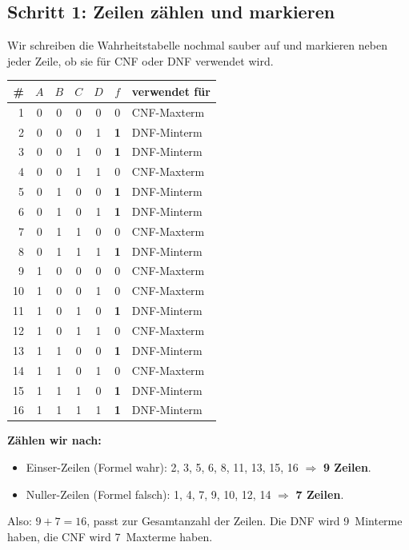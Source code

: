 \documentclass[a4paper,12pt]{article}
\begin{document}
\subsection*{Schritt 1: Zeilen z\"ahlen und markieren}

Wir schreiben die Wahrheitstabelle nochmal sauber auf und markieren
neben jeder Zeile, ob sie f\"ur CNF oder DNF verwendet wird.

\begin{center}
\renewcommand{\arraystretch}{1.1}
\begin{tabular}{r|cccc|c|l}
\toprule
\# & $A$ & $B$ & $C$ & $D$ & $f$ & verwendet f\"ur \\
\midrule
 1 & 0 & 0 & 0 & 0 & 0 & CNF-Maxterm \\
 2 & 0 & 0 & 0 & 1 & \textbf{1} & DNF-Minterm \\
 3 & 0 & 0 & 1 & 0 & \textbf{1} & DNF-Minterm \\
 4 & 0 & 0 & 1 & 1 & 0 & CNF-Maxterm \\
 5 & 0 & 1 & 0 & 0 & \textbf{1} & DNF-Minterm \\
 6 & 0 & 1 & 0 & 1 & \textbf{1} & DNF-Minterm \\
 7 & 0 & 1 & 1 & 0 & 0 & CNF-Maxterm \\
 8 & 0 & 1 & 1 & 1 & \textbf{1} & DNF-Minterm \\
 9 & 1 & 0 & 0 & 0 & 0 & CNF-Maxterm \\
10 & 1 & 0 & 0 & 1 & 0 & CNF-Maxterm \\
11 & 1 & 0 & 1 & 0 & \textbf{1} & DNF-Minterm \\
12 & 1 & 0 & 1 & 1 & 0 & CNF-Maxterm \\
13 & 1 & 1 & 0 & 0 & \textbf{1} & DNF-Minterm \\
14 & 1 & 1 & 0 & 1 & 0 & CNF-Maxterm \\
15 & 1 & 1 & 1 & 0 & \textbf{1} & DNF-Minterm \\
16 & 1 & 1 & 1 & 1 & \textbf{1} & DNF-Minterm \\
\bottomrule
\end{tabular}
\end{center}

\textbf{Z\"ahlen wir nach:}
\begin{itemize}[nosep]
\item Einser-Zeilen (Formel wahr): 2, 3, 5, 6, 8, 11, 13, 15, 16
      $\Rightarrow$ \textbf{9 Zeilen}.
\item Nuller-Zeilen (Formel falsch): 1, 4, 7, 9, 10, 12, 14
      $\Rightarrow$ \textbf{7 Zeilen}.
\end{itemize}
Also: $9 + 7 = 16$, passt zur Gesamtanzahl der Zeilen. Die DNF wird
9~Minterme haben, die CNF wird 7~Maxterme haben.
\end{document}
